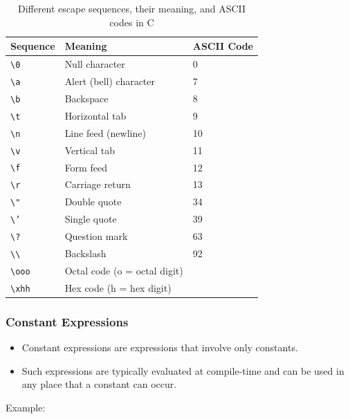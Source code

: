 \documentclass{article}
\newcommand{\code}[1]{\texttt{#1}}
\begin{document}
\begin{table}[H]
    \centering
    \begin{tabular}{|l|l|l|}
        \hline
        \textbf{Sequence} & \textbf{Meaning} & \textbf{ASCII Code} \\
        \hline
        \code{\textbackslash 0} & Null character & 0 \\
        \code{\textbackslash a} & Alert (bell) character & 7 \\
        \code{\textbackslash b} & Backspace & 8 \\
        \code{\textbackslash t} & Horizontal tab & 9 \\
        \code{\textbackslash n} & Line feed (newline) & 10 \\
        \code{\textbackslash v} & Vertical tab & 11 \\
        \code{\textbackslash f} & Form feed & 12 \\
        \code{\textbackslash r} & Carriage return & 13 \\
        \code{\textbackslash "} & Double quote & 34 \\
        \code{\textbackslash '} & Single quote & 39 \\
        \code{\textbackslash ?} & Question mark & 63 \\
        \code{\textbackslash \textbackslash} & Backslash & 92 \\
        \code{\textbackslash ooo} & Octal code (o = octal digit) & \\
        \code{\textbackslash xhh} & Hex code (h = hex digit) & \\
        \hline
    \end{tabular}
    \caption{Different escape sequences, their meaning, and ASCII codes in C}
\end{table}

\subsubsection{Constant Expressions}

\begin{itemize}
    \item Constant expressions are expressions that involve only constants.
    \item Such expressions are typically evaluated at compile-time and can be used in any place that a constant can occur.
\end{itemize}

Example:
\end{document}
